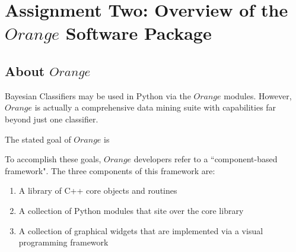 

\graphicspath{{C:/Documents and Settings/amcelhinney/My Documents/GitHub/MCS507--Project-3/tex/include/}}

\section{Assignment Two: Overview of the $Orange$ Software Package} %

\subsection{About $Orange$} %

\begin{flushleft}Bayesian Classifiers may be used in Python via the $Orange$ modules. However, $Orange$ is actually a comprehensive data mining suite with capabilities far beyond just one classifier.
\end{flushleft}

\begin{flushleft}The stated goal of $Orange$ is  
\end{flushleft}

\begin{flushleft}To accomplish these goals, $Orange$ developers refer to a ``component-based framework". The three components of this framework are:
\end{flushleft}
\begin{enumerate}
\item A library of C++ core objects and routines
\item A collection of Python modules that site over the core library
\item A collection of graphical widgets that are implemented via a visual programming framework
\end{enumerate}

